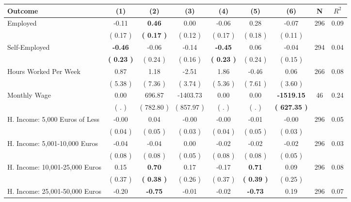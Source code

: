 \begin{tabular}{lcccccccc}
\toprule
 \textbf{Outcome} & \textbf{(1)} & \textbf{(2)} & \textbf{(3)} & \textbf{(4)} & \textbf{(5)} & \textbf{(6)} & \textbf{N} & \textbf{$ R^2$} \\
\midrule
Employed &     -0.11 & \textbf{     0.46} &      0.00 &     -0.06 &      0.28 &     -0.07 & 296 &       0.09 \\ 
 & (     0.17 ) & \textbf{(     0.17 )} & (     0.12 ) & (     0.17 ) & (     0.18 ) & (     0.11 ) & \\
Self-Employed & \textbf{    -0.46} &     -0.06 &     -0.14 & \textbf{    -0.45} &      0.06 &     -0.04 & 294 &       0.04 \\ 
 & \textbf{(     0.23 )} & (     0.24 ) & (     0.16 ) & \textbf{(     0.23 )} & (     0.24 ) & (     0.15 ) & \\
Hours Worked Per Week &      0.87 &      1.18 &     -2.51 &      1.86 &     -0.46 &      0.06 & 266 &       0.08 \\ 
 & (     5.38 ) & (     7.36 ) & (     3.74 ) & (     5.36 ) & (     7.61 ) & (     3.60 ) & \\
Monthly Wage &      0.00 &    696.87 &  -1403.73 &      0.00 &      0.00 & \textbf{ -1519.15} & 46 &       0.24 \\ 
 & (        . ) & (   782.80 ) & (   857.97 ) & (        . ) & (        . ) & \textbf{(   627.35 )} & \\
H. Income: 5,000 Euros of Less &     -0.00 &      0.04 &     -0.00 &     -0.00 &     -0.01 &     -0.00 & 296 &       0.05 \\ 
 & (     0.04 ) & (     0.05 ) & (     0.03 ) & (     0.04 ) & (     0.05 ) & (     0.03 ) & \\
H. Income: 5,001-10,000 Euros &     -0.04 &     -0.04 &      0.00 &     -0.02 &     -0.02 &     -0.02 & 296 &       0.03 \\ 
 & (     0.08 ) & (     0.08 ) & (     0.05 ) & (     0.08 ) & (     0.08 ) & (     0.05 ) & \\
H. Income: 10,001-25,000 Euros &      0.15 & \textbf{     0.70} &      0.17 &     -0.17 & \textbf{     0.71} &      0.09 & 296 &       0.08 \\ 
 & (     0.37 ) & \textbf{(     0.38 )} & (     0.26 ) & (     0.37 ) & \textbf{(     0.39 )} & (     0.25 ) & \\
H. Income: 25,001-50,000 Euros &     -0.20 & \textbf{    -0.75} &     -0.01 &     -0.02 & \textbf{    -0.73} &      0.19 & 296 &       0.07 \\ 

\end{tabular}
